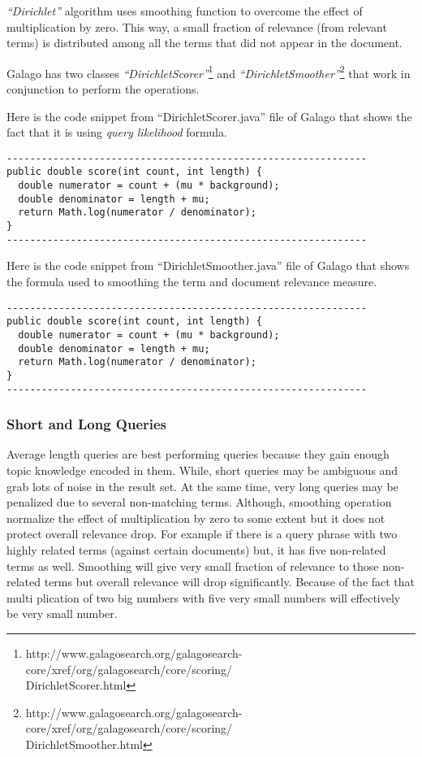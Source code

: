 \documentclass[letterpaper,12pt]{article}
\begin{document}
\emph{``Dirichlet''} algorithm uses smoothing function to overcome the effect of multiplication by zero. This way, a small fraction of relevance (from relevant terms) is distributed among all the terms that did not appear in the document.

Galago has two classes \emph{``DirichletScorer''}\footnote[2]{http://www.galagosearch.org/galagosearch-core/xref/org/galagosearch/core/scoring/\\DirichletScorer.html} and \emph{``DirichletSmoother''}\footnote[3]{http://www.galagosearch.org/galagosearch-core/xref/org/galagosearch/core/scoring/\\DirichletSmoother.html} that work in conjunction to perform the operations.

Here is the code snippet from ``DirichletScorer.java'' file of Galago that shows the fact that it is using \emph{query likelihood} formula.

\begin{verbatim}
--------------------------------------------------------------
public double score(int count, int length) {
  double numerator = count + (mu * background);
  double denominator = length + mu;
  return Math.log(numerator / denominator);
}
--------------------------------------------------------------
\end{verbatim}

Here is the code snippet from ``DirichletSmoother.java'' file of Galago that shows the formula used to smoothing the term and document relevance measure.

\begin{verbatim}
--------------------------------------------------------------
public double score(int count, int length) {
  double numerator = count + (mu * background);
  double denominator = length + mu;
  return Math.log(numerator / denominator);
}
--------------------------------------------------------------
\end{verbatim}

\subsubsection{Short and Long Queries}

Average length queries are best performing queries because they gain enough topic knowledge encoded in them. While, short queries may be ambiguous and grab lots of noise in the result set. At the same time, very long queries may be penalized due to several non-matching terms. Although, smoothing operation normalize the effect of multiplication by zero to some extent but it does not protect overall relevance drop. For example if there is a query phrase with two highly related terms (against certain documents) but, it has five non-related terms as well. Smoothing will give very small fraction of relevance to those non-related terms but overall relevance will drop significantly. Because of the fact that multi plication of two big numbers with five very small numbers will effectively be very small number.
\end{document}
